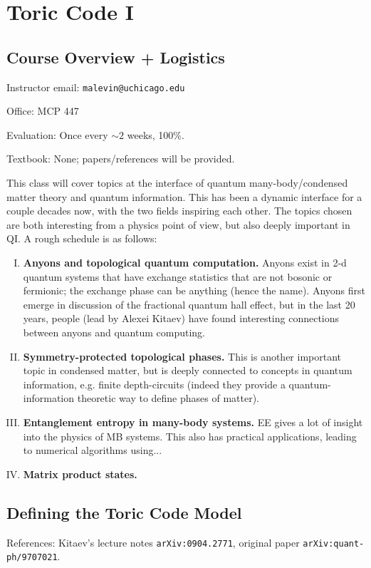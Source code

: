 \section{Toric Code I}

\subsection{Course Overview + Logistics}
Instructor email: \texttt{malevin@uchicago.edu}

\noindent Office: MCP 447

\noindent Evaluation: Once every $\sim 2$ weeks, 100\%.

\noindent Textbook: None; papers/references will be provided.

This class will cover topics at the interface of quantum many-body/condensed matter theory and quantum information. This has been a dynamic interface for a couple decades now, with the two fields inspiring each other. The topics chosen are both interesting from a physics point of view, but also deeply important in QI. A rough schedule is as follows:

\begin{enumerate}[(I)]
    \item \textbf{Anyons and topological quantum computation.} Anyons exist in 2-d quantum systems that have exchange statistics that are not bosonic or fermionic; the exchange phase can be anything (hence the name). Anyons first emerge in discussion of the fractional quantum hall effect, but in the last 20 years, people (lead by Alexei Kitaev) have found interesting connections between anyons and quantum computing.
    \item \textbf{Symmetry-protected topological phases.} This is another important topic in condensed matter, but is deeply connected to concepts in quantum information, e.g. finite depth-circuits (indeed they provide a quantum-information theoretic way to define phases of matter).
    \item \textbf{Entanglement entropy in many-body systems.} EE gives a lot of insight into the physics of MB systems. This also has practical applications, leading to numerical algorithms using...
    \item \textbf{Matrix product states.}
\end{enumerate}

\subsection{Defining the Toric Code Model}
References: Kitaev's lecture notes \texttt{arXiv:0904.2771}, original paper \texttt{arXiv:quant-ph/9707021}.

